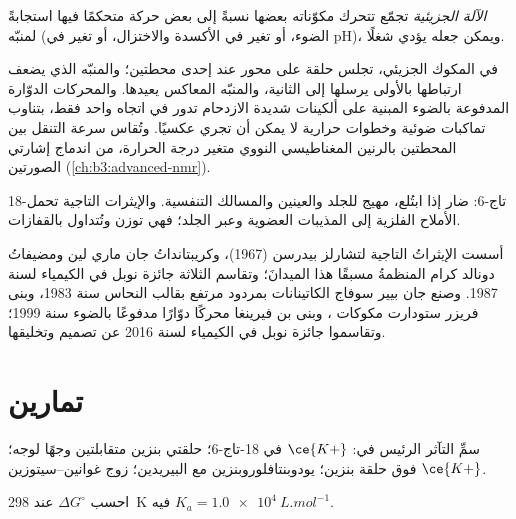 \begin{definition}\label{def:b3:supramolecular:machine}
\emph{الآلة الجزيئية} تجمّع تتحرك
مكوّناته بعضها نسبةً إلى بعض حركة متحكمًا فيها استجابةً لمنبّه
(الضوء، أو تغير في الأكسدة والاختزال، أو تغير في pH)، ويمكن جعله يؤدي شغلًا.
\end{definition}

في المكوك الجزيئي، تجلس حلقة على محور  عند إحدى محطتين؛ 
والمنبّه الذي يضعف ارتباطها بالأولى يرسلها إلى الثانية، 
والمنبّه المعاكس يعيدها. والمحركات الدوّارة المدفوعة بالضوء المبنية على
ألكينات شديدة الازدحام تدور في اتجاه واحد فقط، بتناوب تماكبات
ضوئية وخطوات حرارية لا يمكن أن تجري عكسيًا. وتُقاس سرعة
التنقل بين المحطتين بالرنين المغناطيسي النووي متغير درجة الحرارة، من
اندماج إشارتي الصورتين (\cref{ch:b3:advanced-nmr}).

\begin{safety}{}
18-تاج-6: ضار إذا ابتُلع، مهيج للجلد والعينين والمسالك التنفسية.
والإيثرات التاجية تحمل الأملاح الفلزية إلى المذيبات العضوية وعبر الجلد؛ فهي
توزن وتُتداول بالقفازات.
\end{safety}

\begin{history}
أسست الإيثراتُ التاجية لتشارلز بيدرسن (1967)، وكريبتانداتُ جان ماري لين ومضيفاتُ دونالد
كرام المنظمةُ مسبقًا هذا الميدانَ؛ وتقاسم الثلاثة جائزة نوبل في
الكيمياء لسنة 1987. وصنع جان بيير سوفاج الكاتينانات بمردود مرتفع بقالب
النحاس سنة 1983، وبنى فريزر ستودارت مكوكات ، وبنى بن
فيرينغا محركًا دوّارًا مدفوعًا بالضوء سنة 1999؛ وتقاسموا جائزة نوبل في
الكيمياء لسنة 2016 عن تصميم  وتخليقها.
\end{history}

\section{تمارين}

\begin{exercise}[$\star$]\label{exo:b3:supramolecular:1}
سمِّ التآثر الرئيس في: $\ce{K+}$ في 18-تاج-6؛ حلقتي بنزين متقابلتين وجهًا لوجه؛
$\ce{K+}$ فوق حلقة بنزين؛ يودوبنتافلوروبنزين مع البيريدين؛ زوج
غوانين--سيتوزين.
\end{exercise}

\begin{exercise}[$\star$]\label{exo:b3:supramolecular:2}
احسب $\Delta G^\circ$ عند \qty{298}{K}  فيه $K_a = \qty{1.0e4}{L.mol^{-1}}$.
\end{exercise}

